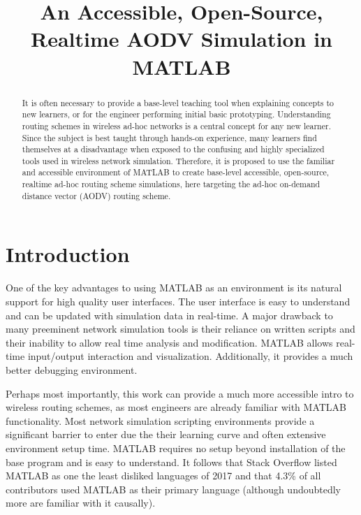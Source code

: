 \documentclass[conference]{IEEEtran}
\begin{document}
\title{An Accessible, Open-Source, Realtime AODV Simulation in MATLAB}
\author{
}

\maketitle

\begin{flushright}\end{flushright}
\begin{abstract}
It is often necessary to provide a base-level teaching tool when explaining concepts to new learners, or for the engineer performing initial basic prototyping. Understanding routing schemes in wireless ad-hoc networks is a central concept for any new learner. Since the subject is best taught through hands-on experience, many learners find themselves at a disadvantage when exposed to the confusing and highly specialized tools used in wireless network simulation. Therefore, it is proposed to use the familiar and accessible environment of MATLAB to create base-level accessible, open-source, realtime ad-hoc routing scheme simulations, here targeting the ad-hoc on-demand distance vector  (AODV) routing scheme.
\end{abstract}

\section{Introduction}
One of the key advantages to using MATLAB as an environment is its natural support for high quality user interfaces. The user interface is easy to understand and can be updated with simulation data in real-time. A major drawback to many preeminent network simulation tools is their reliance on written scripts and their inability to allow real time analysis and modification. MATLAB allows real-time input/output interaction and visualization. Additionally, it provides a much better debugging environment.

Perhaps most importantly, this work can provide a much more accessible intro to wireless routing schemes, as most engineers are already familiar with MATLAB functionality. Most network simulation scripting environments provide a significant barrier to enter due the their learning curve and often extensive environment setup time. MATLAB requires no setup beyond installation of the base program and is easy to understand. It follows that Stack Overflow listed MATLAB as one the least disliked languages of 2017 \cite{stack_overflow_disliked} and that 4.3\% of all contributors used MATLAB as their primary language \cite{stack_overflow_popularity} (although undoubtedly more are familiar with it causally).
\end{document}
